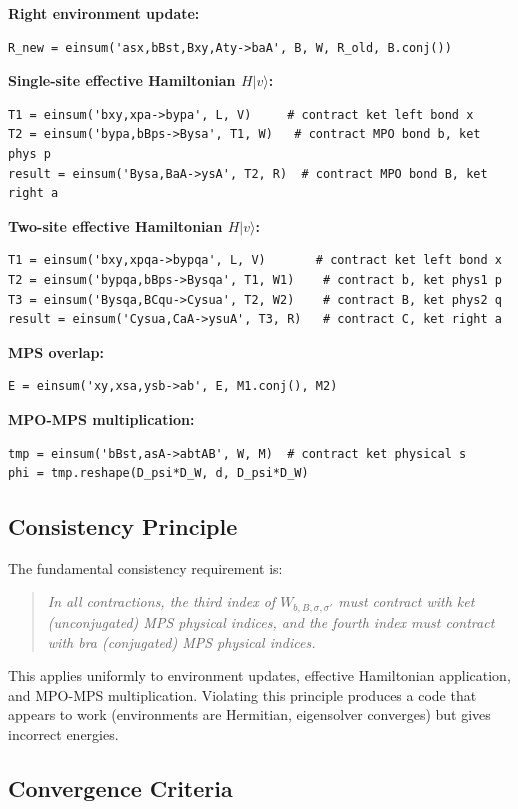 \documentclass[aps,prb,onecolumn,scriptaddress]{revtex4-2}
\begin{document}
\textbf{Right environment update:}
\begin{verbatim}
R_new = einsum('asx,bBst,Bxy,Aty->baA', B, W, R_old, B.conj())
\end{verbatim}

\textbf{Single-site effective Hamiltonian $H|v\rangle$:}
\begin{verbatim}
T1 = einsum('bxy,xpa->bypa', L, V)     # contract ket left bond x
T2 = einsum('bypa,bBps->Bysa', T1, W)   # contract MPO bond b, ket phys p
result = einsum('Bysa,BaA->ysA', T2, R)  # contract MPO bond B, ket right a
\end{verbatim}

\textbf{Two-site effective Hamiltonian $H|v\rangle$:}
\begin{verbatim}
T1 = einsum('bxy,xpqa->bypqa', L, V)       # contract ket left bond x
T2 = einsum('bypqa,bBps->Bysqa', T1, W1)    # contract b, ket phys1 p
T3 = einsum('Bysqa,BCqu->Cysua', T2, W2)    # contract B, ket phys2 q
result = einsum('Cysua,CaA->ysuA', T3, R)   # contract C, ket right a
\end{verbatim}

\textbf{MPS overlap:}
\begin{verbatim}
E = einsum('xy,xsa,ysb->ab', E, M1.conj(), M2)
\end{verbatim}

\textbf{MPO-MPS multiplication:}
\begin{verbatim}
tmp = einsum('bBst,asA->abtAB', W, M)  # contract ket physical s
phi = tmp.reshape(D_psi*D_W, d, D_psi*D_W)
\end{verbatim}

\subsection{Consistency Principle}

The fundamental consistency requirement is:
\begin{quote}
\emph{In all contractions, the third index of $W_{b,B,\sigma,\sigma'}$ must contract with ket (unconjugated) MPS physical indices, and the fourth index must contract with bra (conjugated) MPS physical indices.}
\end{quote}
This applies uniformly to environment updates, effective Hamiltonian application, and MPO-MPS multiplication. Violating this principle produces a code that appears to work (environments are Hermitian, eigensolver converges) but gives incorrect energies.

\subsection{Convergence Criteria}
\end{document}
